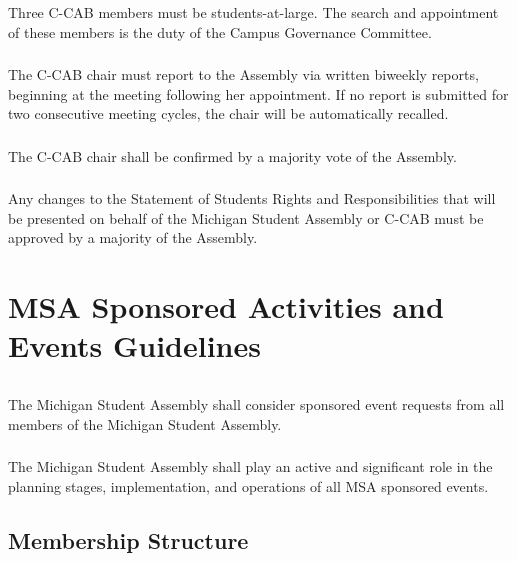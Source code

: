 \subsubsection{}
Three C-CAB members must be students-at-large. The search and appointment of these members is the duty of the Campus Governance Committee. 

\subsubsection{}
The C-CAB chair must report to the Assembly via written biweekly reports, beginning at the meeting following her appointment. If no report is submitted for two consecutive meeting cycles, the chair will be automatically recalled.

\subsubsection{}
The C-CAB chair shall be confirmed by a majority vote of the Assembly. 

\subsubsection{}
Any changes to the Statement of Students Rights and Responsibilities that will be presented on behalf of the Michigan Student Assembly or C-CAB must be approved by a majority of the Assembly.


\section{MSA Sponsored Activities and Events Guidelines}

\subsection{}
The Michigan Student Assembly shall consider sponsored event requests from all members of the Michigan Student Assembly.
\subsubsection{}
The Michigan Student Assembly shall play an active and significant role in the planning stages, implementation, and operations of all MSA sponsored events.


\subsection{Membership Structure}
